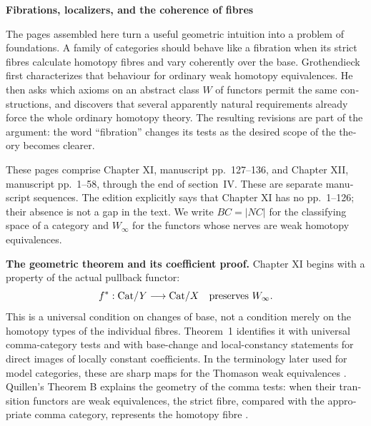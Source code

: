 \begin{otherlanguage}{english}
\begin{otherlanguage}{english}
\noindent\textbf{Fibrations, localizers, and the coherence of fibres}

\medskip
The pages assembled here turn a useful geometric intuition into a problem of foundations. A family of categories should behave like a fibration when its strict fibres calculate homotopy fibres and vary coherently over the base. Grothendieck first characterizes that behaviour for ordinary weak homotopy equivalences. He then asks which axioms on an abstract class \(W\) of functors permit the same constructions, and discovers that several apparently natural requirements already force the whole ordinary homotopy theory. The resulting revisions are part of the argument: the word “fibration” changes its tests as the desired scope of the theory becomes clearer.

These pages comprise Chapter XI, manuscript pp.~127--136, and Chapter XII, manuscript pp.~1--58, through the end of section~IV. These are separate manuscript sequences. The edition explicitly says that Chapter XI has no pp.~1--126; their absence is not a gap in the text. We write \(BC=|NC|\) for the classifying space of a category and \(W_\infty\) for the functors whose nerves are weak homotopy equivalences.

\medskip
\noindent\textbf{The geometric theorem and its coefficient proof.}
Chapter XI begins with a property of the actual pullback functor:
\[
 f^*:\mathrm{Cat}/Y\longrightarrow\mathrm{Cat}/X
 \quad\hbox{preserves }W_\infty.
\]
This is a universal condition on changes of base, not a condition merely on the homotopy types of the individual fibres. Theorem~1 identifies it with universal comma-category tests and with base-change and local-constancy statements for direct images of locally constant coefficients. In the terminology later used for model categories, these are sharp maps for the Thomason weak equivalences \citep[\S2]{Rezk1998Sharp}. Quillen's Theorem B explains the geometry of the comma tests: when their transition functors are weak equivalences, the strict fibre, compared with the appropriate comma category, represents the homotopy fibre \citep[\S1]{Quillen1973}.


\end{otherlanguage}
\end{otherlanguage}
